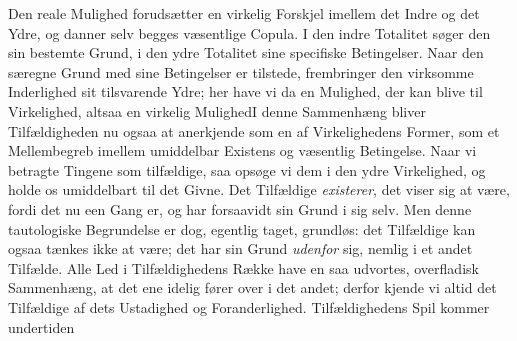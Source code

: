 \documentclass[12pt]{book}
\newcommand{\opage}[1]{\marginnote{\footnotesize\textit{[#1]}}}
\begin{document}
Den reale Mulighed forudsætter en virkelig Forskjel imellem det Indre og det Ydre, og danner
selv begges væsentlige Copula. I den indre Totalitet søger den sin bestemte Grund, i den
ydre Totalitet sine specifiske Betingelser. Naar den særegne Grund med sine Betingelser er
tilstede, frembringer den virksomme Inderlighed sit tilsvarende Ydre; her have vi da en
Mulighed, der kan blive til Virkelighed, altsaa en virkelig Mulighed\quad I denne Sammenhæng
bliver Tilfældigheden nu ogsaa at anerkjende som en af Virkelighedens Former, som et
Mellembegreb imellem umiddelbar Existens og væsentlig Betingelse. Naar vi betragte Tingene
som tilfældige, saa opsøge vi dem i den ydre Virkelighed, og holde os umiddelbart til det
Givne. Det Tilfældige \emph{existerer}, det viser sig at være, fordi det nu een Gang er, og
har forsaavidt sin Grund i sig selv. Men denne tautologiske Begrundelse er dog, egentlig
taget, grundløs: det Tilfældige kan ogsaa tænkes ikke at være; det har sin Grund
\emph{udenfor} sig,
\opage{151} %
nemlig i et andet Tilfælde. Alle Led i Tilfældighedens Række have en saa udvortes,
overfladisk Sammenhæng, at det ene idelig fører over i det andet; derfor kjende vi altid det
Tilfældige af dets Ustadighed og Foranderlighed. Tilfældighedens Spil kommer undertiden
\end{document}
